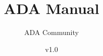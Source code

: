\documentclass[11pt]{book}
\title{ADA Manual}
\author{ADA Community}
\date{v1.0}
\begin{document}
\maketitle
\def\title#1{\chapter{#1}}
\tableofcontents

        
        
\end{document}
